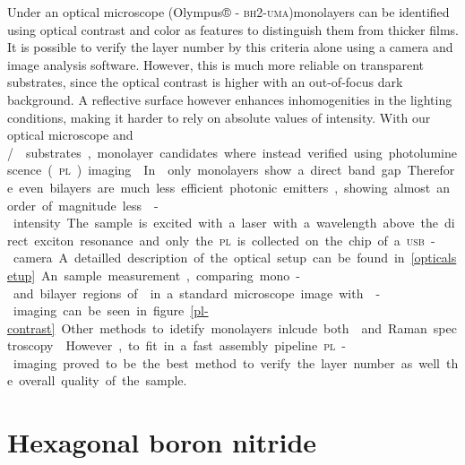 Under an optical microscope (Olympus® - \textsc{bh}2-\textsc{uma})monolayers can be identified using optical contrast and color as features to distinguish them from thicker films. It is possible to verify the layer number by this criteria alone using a camera and image analysis software\cite{funk_spectroscopy_2017}. However, this is much more reliable on transparent substrates, since the optical contrast is higher with an out-of-focus dark background. A reflective surface however enhances inhomogenities in the lighting conditions, making it harder to rely on absolute values of intensity. With our optical microscope and \si/\sio substrates, monolayer candidates where instead verified using photoluminescence (\textsc{pl}) imaging\cite{neumann_opto-valleytronic_2017}. In \tmds only monolayers show a direct band gap. Therefore even bilayers are much less efficient photonic emitters, showing almost an order of magnitude less \pl-intensity. The sample is excited with a laser with a wavelength above the direct exciton resonance and only the \textsc{pl} is collected on the chip of a \textsc{usb}-camera. A detailled description of the optical setup can be found in \ref{opticalsetup}. An sample measurement, comparing mono- and bilayer regions of \wse in a standard microscope image with \pl-imaging can be seen in figure \ref{pl-contrast}. 

Other methods to idetify monolayers inlcude both \pl and Raman spectroscopy\cite{zhao_lattice_2013,zhang_phonon_2015,tonndorf_photoluminescence_2013}. However, to fit in a fast assembly pipeline \textsc{pl}-imaging proved to be the best method to verify the layer number as well the overall quality of the sample.

\section{Hexagonal boron nitride}

